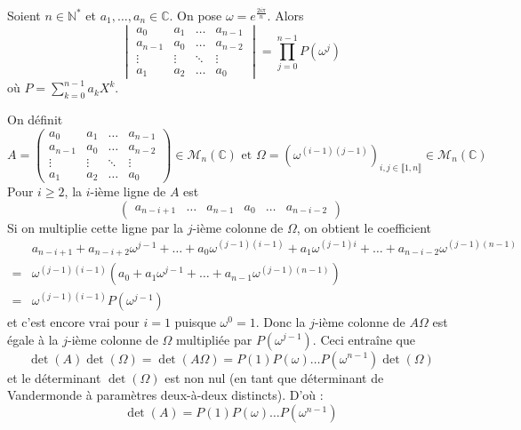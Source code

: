 



	
	
	\begin{lemma}
		\label{suite-de-polygones-1}
		Soient $n \in \mathbb{N}^*$ et $a_1, \dots, a_n \in \mathbb{C}$. On pose $\omega = e^{\frac{2i\pi}{n}}$. Alors
		\[ \begin{vmatrix} a_0 & a_1 & \dots & a_{n-1} \\ a_{n-1} & a_0 & \dots & a_{n-2}\\ \vdots & \vdots & \ddots & \vdots \\ a_1 & a_2 & \dots & a_0 \end{vmatrix} = \prod_{j=0}^{n-1} P(\omega^j) \]
		où $P = \sum_{k=0}^{n-1} a_k X^k$.
	\end{lemma}

	\begin{demonstration}
		On définit
		\[ A = \begin{pmatrix} a_0 & a_1 & \dots & a_{n-1} \\ a_{n-1} & a_0 & \dots & a_{n-2}\\ \vdots & \vdots & \ddots & \vdots \\ a_1 & a_2 & \dots & a_0 \end{pmatrix} \in \mathcal{M}_n(\mathbb{C}) \text{ et } \Omega = (\omega^{(i-1)(j-1)})_{i, j \in \llbracket 1, n \rrbracket} \in \mathcal{M}_n(\mathbb{C}) \]
		Pour $i \geq 2$, la $i$-ième ligne de $A$ est
		\[ \begin{pmatrix} a_{n-i+1} & \dots & a_{n-1} & a_0 & \dots & a_{n-i-2} \end{pmatrix} \]
		Si on multiplie cette ligne par la $j$-ième colonne de $\Omega$, on obtient le coefficient
		\begin{align*}
			&a_{n-i+1} + a_{n-i+2} \omega^{j-1} + \dots + a_0 \omega^{(j-1)(i-1)} + a_1 \omega^{(j-1)i} + \dots + a_{n-i-2} \omega^{(j-1)(n-1)} \\
			=& \omega^{(j-1)(i-1)} (a_0 + a_1 \omega^{j-1} + \dots + a_{n-1} \omega^{(j-1)(n-1)}) \\
			=& \omega^{(j-1)(i-1)} P(\omega^{j-1})
		\end{align*}
		et c'est encore vrai pour $i = 1$ puisque $\omega^0 = 1$. Donc la $j$-ième colonne de $A \Omega$ est égale à la $j$-ième colonne de $\Omega$ multipliée par $P(\omega^{j-1})$. Ceci entraîne que
		\[ \det(A) \det(\Omega) = \det(A\Omega) = P(1) P(\omega) \dots P(\omega^{n-1}) \det(\Omega) \]
		et le déterminant $\det(\Omega)$ est non nul (en tant que déterminant de Vandermonde à paramètres deux-à-deux distincts). D'où :
		\[ \det(A) = P(1) P(\omega) \dots P(\omega^{n-1}) \]
	\end{demonstration}
	
